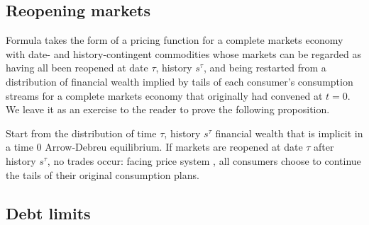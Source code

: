 





\subsection{Reopening markets}

Formula   takes the form of a pricing
function for a complete markets economy with date- and history-contingent
commodities whose markets can be regarded as having all been reopened at date $\tau$, history
$s^\tau$, and being restarted from a distribution of  financial wealth  implied by  tails of each consumer's
consumption streams for a complete markets economy that originally had convened at $t=0$.
 We leave it as an exercise to the
reader to prove the following proposition.


\medskip
{} Start from the distribution of time
$\tau$, history $s^\tau$ financial wealth that is implicit in a time $0$ Arrow-Debreu
equilibrium. If markets are reopened at date $\tau$ after history
$s^\tau$, no trades  occur: facing   price system
, all consumers choose to continue the  tails of their
original consumption plans.
\medskip
{}






 
\subsection{Debt limits}

